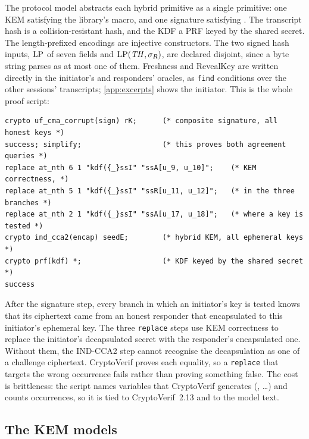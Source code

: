 The protocol model abstracts each hybrid primitive as a single primitive: one
KEM satisfying the library's  macro, and one signature
satisfying . The transcript hash is a
collision-resistant hash, and the KDF a PRF keyed by the shared secret. The
length-prefixed encodings are injective constructors. The two signed hash
inputs, $\mathrm{LP}$ of seven fields and $\mathrm{LP}(\mathit{TH}, \sigma_R)$, are declared
disjoint, since a byte string parses as at most one of them. Freshness and
RevealKey are written directly in the initiator's and responders' oracles,
as \texttt{find} conditions over the other sessions' transcripts;
\cref{app:excerpts} shows the initiator. This is the whole proof script:

\begin{lstlisting}
crypto uf_cma_corrupt(sign) rK;      (* composite signature, all honest keys *)
success; simplify;                   (* this proves both agreement queries *)
replace at_nth 6 1 "kdf({_}ssI" "ssA[u_9, u_10]";    (* KEM correctness, *)
replace at_nth 5 1 "kdf({_}ssI" "ssR[u_11, u_12]";   (* in the three branches *)
replace at_nth 2 1 "kdf({_}ssI" "ssA[u_17, u_18]";   (* where a key is tested *)
crypto ind_cca2(encap) seedE;        (* hybrid KEM, all ephemeral keys *)
crypto prf(kdf) *;                   (* KDF keyed by the shared secret *)
success
\end{lstlisting}

After the signature step, every branch in which an initiator's key is tested
knows that its ciphertext came from an honest responder that encapsulated to
this initiator's ephemeral key. The three \texttt{replace} steps use KEM
correctness to replace the initiator's decapsulated secret with the
responder's encapsulated one. Without them, the IND-CCA2 step cannot
recognise the decapsulation as one of a challenge ciphertext. CryptoVerif
proves each equality, so a \texttt{replace} that targets the wrong
occurrence fails rather than proving something false. The cost is
brittleness: the script names variables that CryptoVerif generates
(, \ldots) and counts occurrences, so it is tied to
CryptoVerif~2.13 and to the model text.

\subsection{The KEM models}\label{sec:mech:kem}

